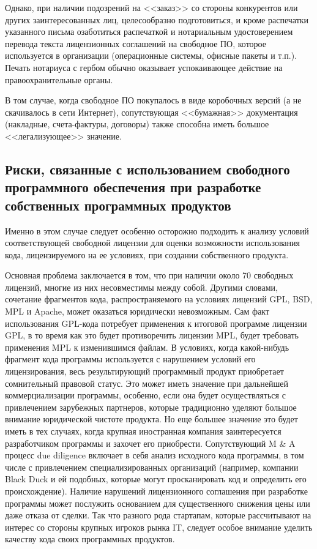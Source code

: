 \documentclass[10pt, a5paper]{article}
\begin{document}
Однако, при наличии подозрений на <<заказ>> со стороны конкурентов или других заинтересованных лиц, целесообразно подготовиться, и кроме распечатки указанного письма озаботиться распечаткой и нотариальным удостоверением перевода текста лицензионных соглашений на свободное ПО, которое используется в организации (операционные системы, офисные пакеты и т.п.). Печать нотариуса с гербом обычно оказывает успокаивающее действие на правоохранительные органы.

В том случае, когда свободное ПО покупалось в виде коробочных версий (а не скачивалось в сети Интернет), сопутствующая <<бумажная>> документация (накладные, счета-фактуры, договоры) также способна иметь большое <<легализующее>> значение.

\subsection*{Риски, связанные с использованием свободного \\  программного обеспечения при разработке \\ собственных программных продуктов}

Именно в этом случае следует особенно осторожно подходить к анализу условий соответствующей свободной лицензии для оценки возможности использования кода, лицензируемого на ее условиях, при создании собственного продукта.

Основная проблема заключается в том, что при наличии около 70 свободных лицензий, многие из них несовместимы между собой. Другими словами, сочетание фрагментов кода, распространяемого на условиях лицензий GPL, BSD, MPL и Apache, может оказаться юридически невозможным. Сам факт использования GPL-кода потребует применения к итоговой программе лицензии GPL, в то время как это будет противоречить лицензии MPL, будет требовать применения MPL к изменившимся файлам. В условиях, когда какой-нибудь фрагмент кода программы используется с нарушением условий его лицензирования, весь результирующий программный продукт приобретает сомнительный правовой статус. Это может иметь значение при дальнейшей коммерциализации программы, особенно, если она будет осуществляться с привлечением зарубежных партнеров, которые традиционно уделяют большое внимание юридической чистоте продукта. Но еще большее значение это будет иметь в тех случаях, когда крупная иностранная компания заинтересуется разработчиком программы и захочет его приобрести. Сопутствующий M \& A процесс due diligence включает в себя анализ исходного кода программы, в том числе с привлечением специализированных организаций (например, компании Black Duck и ей подобных, которые могут просканировать код и определить его происхождение). Наличие нарушений лицензионного соглашения при разработке программы может послужить основанием для существенного снижения цены или даже отказа от сделки. Так что разного рода стартапам, которые рассчитывают на интерес со стороны крупных игроков рынка IT, следует особое внимание уделить качеству кода своих программных продуктов.
\end{document}
